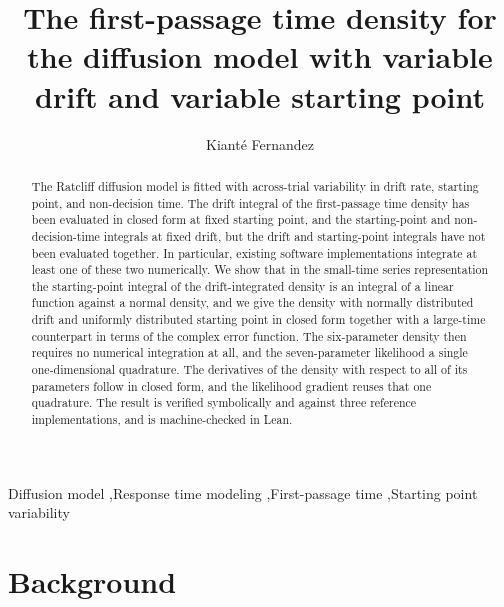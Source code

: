 \documentclass[final,5p,times,twocolumn,authoryear]{elsarticle}
\begin{document}
\begin{frontmatter}

\title{The first-passage time density for the diffusion model with variable drift and variable starting point}

\author{Kiant\'e Fernandez}
\address{Department of Psychology, University of California, Los Angeles, 1285 Franz Hall, Los Angeles, CA 90095, United States}

\begin{abstract}
The Ratcliff diffusion model is fitted with across-trial variability in drift rate, starting point, and non-decision time. The drift integral of the first-passage time density has been evaluated in closed form at fixed starting point, and the starting-point and non-decision-time integrals at fixed drift, but the drift and starting-point integrals have not been evaluated together. In particular, existing software implementations integrate at least one of these two numerically. We show that in the small-time series representation the starting-point integral of the drift-integrated density is an integral of a linear function against a normal density, and we give the density with normally distributed drift and uniformly distributed starting point in closed form together with a large-time counterpart in terms of the complex error function. The six-parameter density then requires no numerical integration at all, and the seven-parameter likelihood a single one-dimensional quadrature. The derivatives of the density with respect to all of its parameters follow in closed form, and the likelihood gradient reuses that one quadrature. The result is verified symbolically and against three reference implementations, and is machine-checked in Lean.
\end{abstract}

\begin{keyword}
Diffusion model \sep Response time modeling \sep First-passage time \sep Starting point variability
\end{keyword}

\end{frontmatter}


\section{Background}
\end{document}

